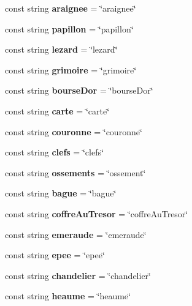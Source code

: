 \begin{DoxyCompactItemize}
const string {\bfseries araignee} = \char`\"{}araignee\char`\"{}
\item 
\mbox{\label{class_card_a901be3287affed5970621cac2b886705}} 
const string {\bfseries papillon} = \char`\"{}papillon\char`\"{}
\item 
\mbox{\label{class_card_ad1346ff67f637388e8df7cccbbc12315}} 
const string {\bfseries lezard} = \char`\"{}lezard\char`\"{}
\item 
\mbox{\label{class_card_a05c8f3411e20a50cf8972363e076f2cc}} 
const string {\bfseries grimoire} = \char`\"{}grimoire\char`\"{}
\item 
\mbox{\label{class_card_a405acedb393cdae85111cec09226d012}} 
const string {\bfseries bourse\+Dor} = \char`\"{}bourse\+Dor\char`\"{}
\item 
\mbox{\label{class_card_a673085176fb5f666e21ea3f3a0cfa27f}} 
const string {\bfseries carte} = \char`\"{}carte\char`\"{}
\item 
\mbox{\label{class_card_a210fdd4d2dc4a7e74a7cb0201c4bf177}} 
const string {\bfseries couronne} = \char`\"{}couronne\char`\"{}
\item 
\mbox{\label{class_card_a30671222c2cc86ebe07dbc358dff7dbe}} 
const string {\bfseries clefs} = \char`\"{}clefs\char`\"{}
\item 
\mbox{\label{class_card_acbf4b4aa4851eb017e0e1d422066db81}} 
const string {\bfseries ossements} = \char`\"{}ossement\char`\"{}
\item 
\mbox{\label{class_card_a1c15cba66516b2c7bb415c898bf0bec8}} 
const string {\bfseries bague} = \char`\"{}bague\char`\"{}
\item 
\mbox{\label{class_card_a363e6b072db084785a7577a8122c3eba}} 
const string {\bfseries coffre\+Au\+Tresor} = \char`\"{}coffre\+Au\+Tresor\char`\"{}
\item 
\mbox{\label{class_card_aa008e3918b20d79db148d77388ec07d7}} 
const string {\bfseries emeraude} = \char`\"{}emeraude\char`\"{}
\item 
\mbox{\label{class_card_a7c67f684111fc3a4262330e30374f5b3}} 
const string {\bfseries epee} = \char`\"{}epee\char`\"{}
\item 
\mbox{\label{class_card_a6e93df3360b4708d75f6f32f5615a1ac}} 
const string {\bfseries chandelier} = \char`\"{}chandelier\char`\"{}
\item 
\mbox{\label{class_card_afd85893c89e622a5e63fd2f8201d7050}} 
const string {\bfseries heaume} = \char`\"{}heaume\char`\"{}
\end{DoxyCompactItemize}
